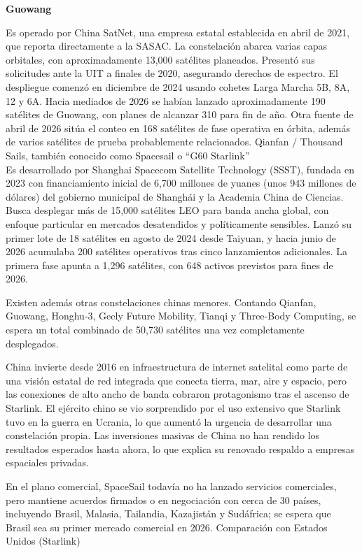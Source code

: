 \noindent\textbf{Guowang}

Es operado por China SatNet, una empresa estatal establecida en abril de 2021, que reporta directamente a la SASAC. La constelación abarca varias capas orbitales, con aproximadamente 13,000 satélites planeados. Presentó sus solicitudes ante la UIT a finales de 2020, asegurando derechos de espectro. El despliegue comenzó en diciembre de 2024 usando cohetes Larga Marcha 5B, 8A, 12 y 6A. Hacia mediados de 2026 se habían lanzado aproximadamente 190 satélites de Guowang, con planes de alcanzar 310 para fin de año. Otra fuente de abril de 2026 sitúa el conteo en 168 satélites de fase operativa en órbita, además de varios satélites de prueba probablemente relacionados.
Qianfan / Thousand Sails, también conocido como Spacesail o ``G60 Starlink''\\
Es desarrollado por Shanghai Spacecom Satellite Technology (SSST), fundada en 2023 con financiamiento inicial de 6,700 millones de yuanes (unos 943 millones de dólares) del gobierno municipal de Shanghái y la Academia China de Ciencias. Busca desplegar más de 15,000 satélites LEO para banda ancha global, con enfoque particular en mercados desatendidos y políticamente sensibles. Lanzó su primer lote de 18 satélites en agosto de 2024 desde Taiyuan, y hacia junio de 2026 acumulaba 200 satélites operativos tras cinco lanzamientos adicionales. La primera fase apunta a 1,296 satélites, con 648 activos previstos para fines de 2026.

Existen además otras constelaciones chinas menores. Contando Qianfan, Guowang, Honghu-3, Geely Future Mobility, Tianqi y Three-Body Computing, se espera un total combinado de 50,730 satélites una vez completamente desplegados.


China invierte desde 2016 en infraestructura de internet satelital como parte de una visión estatal de red integrada que conecta tierra, mar, aire y espacio, pero las conexiones de alto ancho de banda cobraron protagonismo tras el ascenso de Starlink. El ejército chino se vio sorprendido por el uso extensivo que Starlink tuvo en la guerra en Ucrania, lo que aumentó la urgencia de desarrollar una constelación propia. Las inversiones masivas de China no han rendido los resultados esperados hasta ahora, lo que explica su renovado respaldo a empresas espaciales privadas.

En el plano comercial, SpaceSail todavía no ha lanzado servicios comerciales, pero mantiene acuerdos firmados o en negociación con cerca de 30 países, incluyendo Brasil, Malasia, Tailandia, Kazajistán y Sudáfrica; se espera que Brasil sea su primer mercado comercial en 2026.
Comparación con Estados Unidos (Starlink)



